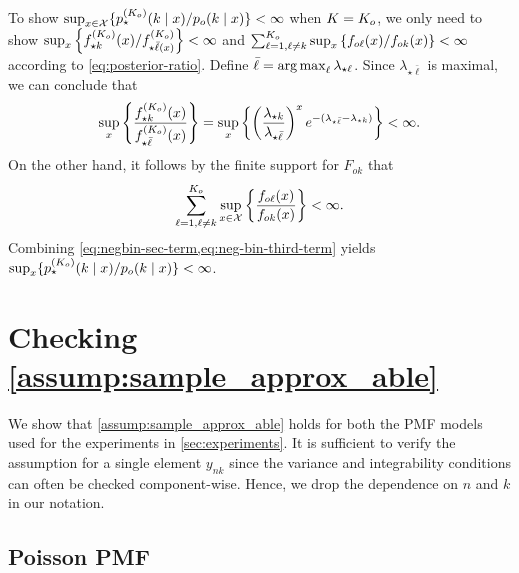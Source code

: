 To show $\sup_{x \in \mathcal{X}} \{p_{\star}^{(K_{o})}(k \mid x)/p_{o}(k \mid x)\} < \infty$ when $K = K_{o}$, we only need to show $\sup_{x} \left\{  f^{(K_o)}_{\star k}(x)/f^{(K_o)}_{\star \bar{\ell}(x)}\right\}<\infty$ and $ \sum_{\ell=1, \ell\ne k}^{K_o}\sup_{x}\left\{f_{o\ell}(x)/f_{ok}(x)\right\} < \infty$ according to \cref{eq:posterior-ratio}. Define $\bar{\ell} = \argmax_\ell \lambda_{\star \ell}$.  
Since $\lambda_{\star \bar{\ell}}$ is maximal, we can conclude that
    \begin{align}
\sup_{x} \left\{  \frac{f^{(\numcomps_o)}_{\star k}(x)}{f^{(\numcomps_o)}_{\star \bar{\ell}}(x)}\right\} = \sup_{x} \left\{ \left(\frac{\lambda_{\star k}}{\lambda_{\star \bar{\ell}}}\right)^x e^{-(\lambda_{\star \bar{\ell}} - \lambda_{\star k} )}\right\} < \infty. \label{eq:negbin-sec-term}
\end{align}
On the other hand, it follows by the finite support for $F_{ok}$ that 
\begin{align}
    \sum_{\ell=1, \ell\ne k}^{\numcomps_o}\sup_{x\in\mathcal{X}}\left\{\frac{f_{o\ell}(x)}{f_{ok}(x)}\right\} < \infty. \label{eq:neg-bin-third-term}
\end{align}
Combining \cref{eq:negbin-sec-term,eq:neg-bin-third-term} yields $\sup_x\{ p_{\star}^{(K_{o})}(k \mid x)/p_{o}(k \mid x) \}< \infty$.

\section{Checking \cref{assump:sample_approx_able}}\label{sec:sample_approx_able_example}

We show that \cref{assump:sample_approx_able} holds for both the PMF models used for the experiments in \cref{sec:experiments}. 
It is sufficient to verify the assumption for a single element $y_{nk}$ since the variance and integrability conditions can often be checked component-wise.
Hence, we drop the dependence on $n$ and $k$ in our notation. 

\subsection{Poisson PMF}

